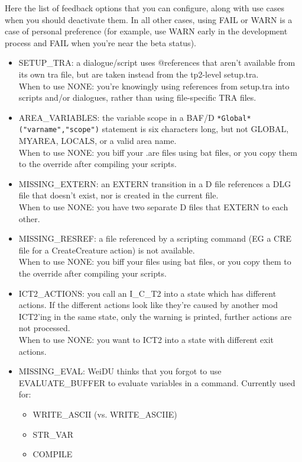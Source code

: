 \documentclass{article}
\begin{document}
Here the list of feedback options that you can configure, along with use cases when you
should deactivate them. In all other cases, using FAIL or WARN is a case of personal
preference (for example, use WARN early in the development process and FAIL when you're
near the beta status).
\begin{itemize}
\item SETUP_TRA: a dialogue/script uses @references that aren't available from
     its own tra file, but are taken instead from the tp2-level setup.tra.
     \\
     When to use NONE: you're knowingly using references from
     setup.tra into scripts and/or dialogues, rather than using file-specific TRA files.
\item AREA_VARIABLES: the variable scope in a BAF/D \verb+*Global*("varname","scope")+
     statement is six characters long, but not GLOBAL, MYAREA, LOCALS, or a valid area name.
     \\
     When to use NONE: you biff your .are files using bat files, or you copy them to
		 the override after compiling your scripts.
\item MISSING_EXTERN: an EXTERN transition in a D file references a DLG file that
     doesn't exist, nor is created in the current file.
     \\
     When to use NONE: you have two separate D files that EXTERN to each other.
\item MISSING_RESREF: a file referenced by a scripting command (EG a CRE file for a
     CreateCreature action) is not available.
     \\
     When to use NONE: you biff your files using bat files, or you copy them to
		 the override after compiling your scripts.
\item ICT2_ACTIONS: you call an I_C_T2 into a state which has different actions.
		 If the different actions look like they're caused by another mod ICT2'ing in
		 the same state, only the warning is printed, further actions are not processed.
     \\
     When to use NONE: you want to ICT2 into a state with different exit actions.
\item MISSING_EVAL: WeiDU thinks that you forgot to use
  EVALUATE_BUFFER to evaluate variables in a command. Currently used
  for:
     \begin{itemize}
     \item WRITE_ASCII (vs. WRITE_ASCIIE)
     \item STR_VAR
     \item COMPILE

\end{itemize}
\end{itemize}
\end{document}
